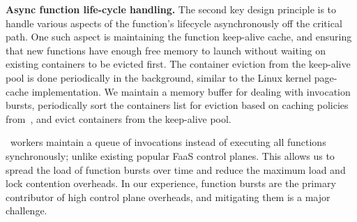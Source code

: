 




\noindent \textbf{Async function life-cycle handling.}
The second key design principle is to handle various aspects of the function's lifecycle asynchronously off the critical path. 
One such aspect is maintaining the function keep-alive cache, and ensuring that new functions have enough free memory to launch without waiting on existing containers to be evicted first.  
The container eviction from the keep-alive pool is done periodically in the background, similar to the Linux kernel page-cache implementation.
We maintain a memory buffer for dealing with invocation bursts, periodically sort the containers list for eviction based on caching policies from~\cite{faascache-asplos21}, and evict containers from the keep-alive pool.

\sysname~workers maintain a queue of invocations instead of executing all functions synchronously; unlike existing popular FaaS control planes.
This allows us to spread the load of function bursts over time and reduce the maximum load and lock contention overheads.
In our experience, function bursts are the primary contributor of high control plane overheads, and mitigating them is a major challenge. 


